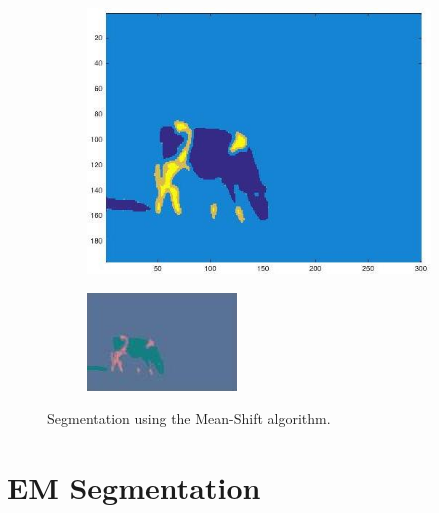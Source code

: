 \documentclass{ethz_report}
\begin{document}
\begin{figure}[h]
    \centering
    \begin{subfigure}[b]{.5\textwidth}
        \centering
        \includegraphics[width=1\linewidth]{images/seg_mean_shift}
    \end{subfigure}%
    \begin{subfigure}[b]{.5\textwidth}
        \centering
        \includegraphics[width=1\linewidth]{images/seg_mean_shift_color}
    \end{subfigure}
    \caption{Segmentation using the Mean-Shift algorithm.}
    \label{fig:mean_shift}
\end{figure}

\section*{EM Segmentation}
\end{document}
